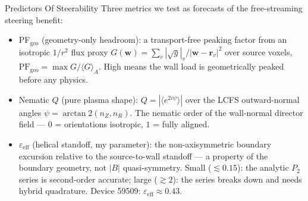 \documentclass[11pt,aspectratio=169]{beamer}
\begin{document}
\begin{frame}{Predictors Of Steerability}
\footnotesize
Three metrics we test as forecasts of the free-streaming steering benefit:
\begin{itemize}
\item PF$_\mathrm{geo}$ (geometry-only headroom): a transport-free peaking factor from an
      isotropic $1/r^2$ flux proxy $G(\mathbf{w})=\sum_v |\sqrt{g}|_v/|\mathbf{w}-\mathbf{r}_v|^2$
      over source voxels, $\mathrm{PF}_\mathrm{geo}=\max G/\langle G\rangle_A$. High means the
      wall load is geometrically peaked before any physics.
\item Nematic $Q$ (pure plasma shape): $Q=|\langle e^{2i\psi}\rangle|$ over the LCFS
      outward-normal angles $\psi=\arctan2(n_Z,n_R)$. The nematic order of the wall-normal
      director field --- $0$ = orientations isotropic, $1$ = fully aligned.
\item $\varepsilon_\mathrm{eff}$ (helical standoff, my parameter): the non-axisymmetric
      boundary excursion relative to the source-to-wall standoff --- a property of the
      boundary geometry, not $|B|$ quasi-symmetry. Small ($\lesssim0.15$): the analytic
      $P_2$ series is second-order accurate; large ($\gtrsim2$): the series breaks down and
      needs hybrid quadrature. Device 59509: $\varepsilon_\mathrm{eff}\approx0.43$.
\end{itemize}
\end{frame}
\end{document}

